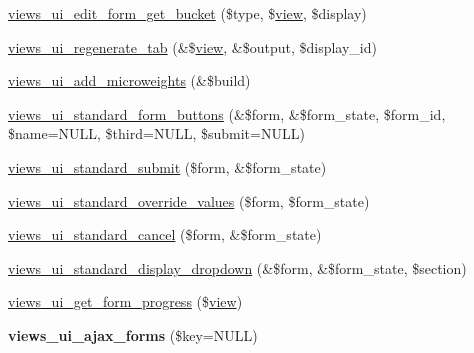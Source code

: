 \begin{DoxyCompactItemize}
\item 
\hyperlink{admin_8inc_a926e3094317ec9bef205685362981d39}{views\_\-ui\_\-edit\_\-form\_\-get\_\-bucket} (\$type, \$\hyperlink{classview}{view}, \$display)
\item 
\hyperlink{admin_8inc_a0c7f4e9787916976d7dab26c969f2cea}{views\_\-ui\_\-regenerate\_\-tab} (\&\$\hyperlink{classview}{view}, \&\$output, \$display\_\-id)
\item 
\hyperlink{admin_8inc_a21c22d965161a3efb6b1f10570d3f9cd}{views\_\-ui\_\-add\_\-microweights} (\&\$build)
\item 
\hyperlink{admin_8inc_a14c82c16cedbaecf8fb20e1aabc1a15b}{views\_\-ui\_\-standard\_\-form\_\-buttons} (\&\$form, \&\$form\_\-state, \$form\_\-id, \$name=NULL, \$third=NULL, \$submit=NULL)
\item 
\hyperlink{admin_8inc_a9af5bfc6978dc754bdfe126ac758deda}{views\_\-ui\_\-standard\_\-submit} (\$form, \&\$form\_\-state)
\item 
\hyperlink{admin_8inc_a6fac05da3f398e15cb5a65095a755d42}{views\_\-ui\_\-standard\_\-override\_\-values} (\$form, \$form\_\-state)
\item 
\hyperlink{admin_8inc_a69c20e73b4a54447f15797c44bdb8344}{views\_\-ui\_\-standard\_\-cancel} (\$form, \&\$form\_\-state)
\item 
\hyperlink{admin_8inc_a097b738809afa14fdc78f40dff3fd3b0}{views\_\-ui\_\-standard\_\-display\_\-dropdown} (\&\$form, \&\$form\_\-state, \$section)
\item 
\hyperlink{admin_8inc_a2be3967d1a19ae016b180cbdb084c107}{views\_\-ui\_\-get\_\-form\_\-progress} (\$\hyperlink{classview}{view})
\item 
\hypertarget{admin_8inc_a28d1560f6713eda756f9463d635ba97f}{
{\bfseries views\_\-ui\_\-ajax\_\-forms} (\$key=NULL)}
\label{admin_8inc_a28d1560f6713eda756f9463d635ba97f}


\end{DoxyCompactItemize}
